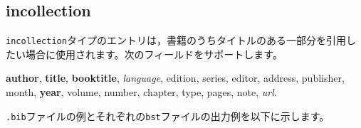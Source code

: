 \documentclass[10pt, a4paper, dvipdfmx, uplatex]{jsarticle} %
\renewcommand{\refname}{\small 参考文献}
\newcommand{\putlst}[1]{
  \noindent\makebox[\linewidth]{\rule{\linewidth}{0.4pt}}\vspace{-1.5zw}
  \vspace{-1.8zw}
  \noindent\makebox[\linewidth]{\rule{\linewidth}{0.4pt}}\vspace{0.5zw}\par
}
\begin{document}
\begin{bibunit}[IEEJtran]
  \nocite{Inproceedings,jpInproceedings1,enInproceedings1,jpInproceedings2,enInproceedings2}
  \renewcommand{\refname}{\small 参考文献(IEEJtran.bst)}
  {\small \putbib[./inproceedings]}
\end{bibunit}
\begin{bibunit}[jIEEEtran]
  \nocite{Inproceedings,jpInproceedings1,enInproceedings1,jpInproceedings2,enInproceedings2}
  \renewcommand{\refname}{\small 参考文献(jIEEEtran.bst)}
  {\small \putbib[./inproceedings]}
\end{bibunit}
\begin{bibunit}[IEEJtran]
  \nocite{jpInproceedings1/ej/enInproceedings1,jpInproceedings2/ej/enInproceedings2}
  \renewcommand{\refname}{\small 英日を併記した参考文献(IEEJtran.bst)}
  {\small \putbib[./inproceedings]}
\end{bibunit}
\begin{bibunit}[jIEEEtran]
  \nocite{jpInproceedings1/ej/enInproceedings1,jpInproceedings2/ej/enInproceedings2}
  \renewcommand{\refname}{\small 英日を併記した参考文献(jIEEEtran.bst)}
  {\small \putbib[./inproceedings]}
\end{bibunit}



\subsection{incollection}

\texttt{incollection}タイプのエントリは，書籍のうちタイトルのある一部分を引用したい場合に使用されます。次のフィールドをサポートします。

\begin{center}
  \textbf{author}, \textbf{title}, \textbf{booktitle}, \textsl{language}, edition, series, editor, address, publisher, \\
  month, \textbf{year}, volume, number, chapter, type, pages, note, \textsl{url}.
\end{center}

\texttt{.bib}ファイルの例とそれぞれの\texttt{bst}ファイルの出力例を以下に示します。

\putlst{incollection.bib}
\end{document}
